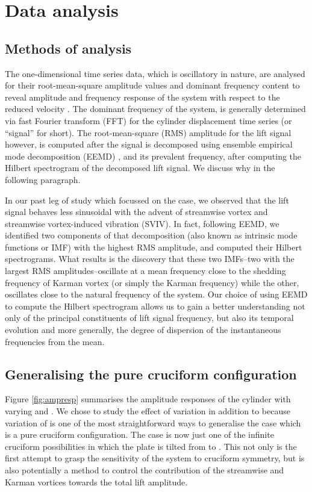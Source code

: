 \documentclass[a4paper]{article}
\begin{document}
\section{Data analysis} \label{analysis}

\subsection{Methods of analysis}

The one-dimensional time series data, which is oscillatory in nature, are analysed for their root-mean-square amplitude values and dominant frequency content to reveal amplitude and frequency response of the system with respect to the reduced velocity \ured{}. The dominant frequency of the system, is generally determined via fast Fourier transform (FFT) for the cylinder displacement time series (or ``signal'' for short). The root-mean-square (RMS) amplitude for the lift signal however, is computed after the signal is decomposed using ensemble empirical mode decomposition (EEMD) \parencite{Huang1998,Wu2008}, and its prevalent frequency, after computing the Hilbert spectrogram of the decomposed lift signal. We discuss why in the following paragraph.

In our past leg of study which focussed on the \rfo{} case, we observed that the lift signal behaves less sinusoidal with the advent of streamwise vortex and streamwise vortex-induced vibration (SVIV). In fact, following EEMD, we identified two components of that decomposition (also known as intrinsic mode functions or IMF) with the highest RMS amplitude, and computed their Hilbert spectrograms. What results is the discovery that these two IMFs--two with the largest RMS amplitudes--oscillate at a mean frequency close to the shedding frequency of Karman vortex (or simply the Karman frequency) while the other, oscillates close to the natural frequency of the system. Our choice of using EEMD to compute the Hilbert spectrogram allows us to gain a better understanding not only of the principal constituents of lift signal frequency, but also its temporal evolution and more generally, the degree of dispersion of the instantaneous frequencies from the mean. 

\subsection{Generalising the pure cruciform configuration}

Figure \ref{fig:ampresp} summarises the amplitude responses of the cylinder with varying \ured{} and \ptlt{}. We chose to study the effect of \ptlt{} variation in addition to \ured{} because variation of \ptlt{} is one of the most straightforward ways to generalise the \rfo{} case which is a pure cruciform configuration. The \rfo{} case is now just one of the infinite cruciform possibilities in which the plate is tilted from \rze{} to \rfo{}. This not only is the first attempt to grasp the sensitivity of the system to cruciform symmetry, but is also potentially a method to control the contribution of the streamwise and Karman vortices towards the total lift amplitude.
\end{document}
